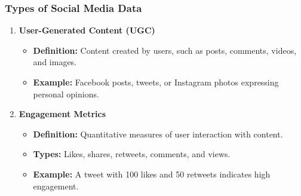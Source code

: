 \documentclass{beamer}
\begin{document}
\begin{frame}[fragile]
    \frametitle{Types of Social Media Data}
    \begin{enumerate}
        \item \textbf{User-Generated Content (UGC)}
            \begin{itemize}
                \item \textbf{Definition:} Content created by users, such as posts, comments, videos, and images.
                \item \textbf{Example:} Facebook posts, tweets, or Instagram photos expressing personal opinions.
            \end{itemize}
        \item \textbf{Engagement Metrics}
            \begin{itemize}
                \item \textbf{Definition:} Quantitative measures of user interaction with content.
                \item \textbf{Types:} Likes, shares, retweets, comments, and views.
                \item \textbf{Example:} A tweet with 100 likes and 50 retweets indicates high engagement.
            \end{itemize}
    \end{enumerate}
\end{frame}
\end{document}
